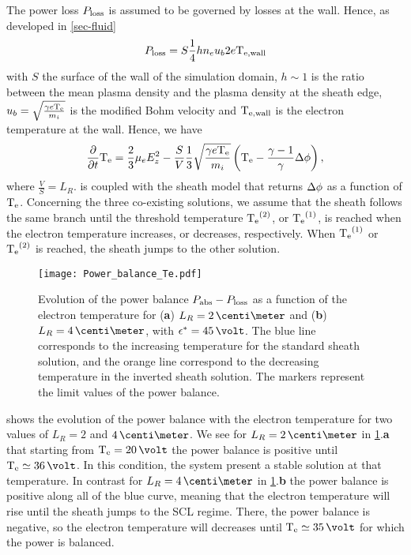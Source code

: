    The power loss $P_{\rm loss}$ is assumed to be governed by losses at the wall.
    Hence, as developed in \cref{sec-fluid}
    \begin{equation} \label{eq-Ploss}
      P_{\rm loss} = S \frac{1}{4} h n_e u_b 2 e\mathrm{T_{e, wall}}
    \end{equation}
    with $S$ the surface of the wall of the simulation domain, $h \sim 1$ is the ratio between the mean plasma density and the plasma density at the sheath edge, $u_b = \sqrt{\frac{\gamma e \mathrm{T_e}}{m_i}}$ is the modified Bohm velocity and $\mathrm{T_{e, wall}}$ is the electron temperature at the wall.
    Hence, we have
    \begin{equation} \label{eq-MG_bis}
    \frac{\partial }{\partial t} \mathrm{T_e} = \frac{2}{3} \mu_e  E_z^2 - \frac{S}{V} \frac{1}{3} \sqrt{\frac{\gamma e \mathrm{T_e}}{m_i}}  \left( \mathrm{T_e} - \frac{\gamma - 1}{\gamma} \Delta \phi \right),
    \end{equation}
    where $\frac{V}{S} = L_R$.
     is coupled with the sheath model that returns $\Delta \phi$ as a function of $\mathrm{T_e}$.
    Concerning the three co-existing solutions, we assume that the sheath follows the same branch until the threshold temperature $\mathrm{T_e}^{(2)}$, or $\mathrm{T_e}^{(1)}$, is reached when the electron temperature increases, or decreases, respectively.
    When $\mathrm{T_e}^{(1)}$ or $\mathrm{T_e}^{(2)}$ is reached, the sheath jumps to the other solution.
    
    
    \begin{figure}[!hbt]
      \centering
      \texttt{[image: Power\_balance\_Te.pdf]}
      \caption{Evolution of the power balance $P_{\rm abs}-P_{\rm loss}$ as a function of the electron temperature for ({\bf a}) $L_R=2\,\centi\meter$ and ({\bf b}) $L_R=4\,\centi\meter$, with $\crover=45\,\volt$. The blue line corresponds to the increasing temperature for the standard sheath solution, and the orange line correspond to the decreasing temperature in the inverted sheath solution. The markers represent the limit values of the power balance.}
      \label{fig-powerbalance}
    \end{figure}
    
     shows the evolution of the power balance with the electron temperature for two values of $L_R=2$ and $4\,\centi\meter$.
    We see for $L_R=2\,\centi\meter$ in \cref{fig-powerbalance}.{\bf a} that starting from $\Te=20\,\volt$ the power balance is positive until $\Te\simeq36\,\volt$.
    In this condition, the system present a stable solution at that temperature.
    In contrast for $L_R=4\,\centi\meter$ in \cref{fig-powerbalance}.{\bf b} the power balance is positive along all of the blue curve, meaning that the electron temperature will rise until the sheath jumps to the \ac{SCL} regime.
    There, the power balance is negative, so the electron temperature will decreases until $\Te\simeq35\,\volt$ for which the power is balanced.
    
